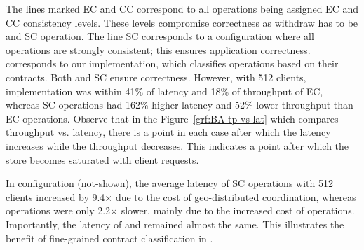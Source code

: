 The lines marked EC and CC correspond to all operations being assigned EC and
CC consistency levels. These levels compromise correctness as withdraw has to
be and SC operation. The line SC corresponds to a configuration where all
operations are strongly consistent; this ensures application correctness.
\quelea corresponds to our implementation, which classifies operations based on
their contracts. Both \quelea and SC ensure correctness. However, with 512
clients, \quelea implementation was within 41\% of latency and 18\% of
throughput of EC, whereas SC operations had 162\% higher latency and 52\% lower
throughput than EC operations. Observe that in the
Figure~\ref{grf:BA-tp-vs-lat} which compares throughput vs. latency, there is a
point in each case after which the latency increases while the throughput
decreases. This indicates a point after which the store becomes saturated with
client requests.

In  configuration (not-shown), the average latency of SC operations
with 512 clients increased by 9.4$\times$ due to the cost of geo-distributed
coordination, whereas \quelea operations were only 2.2$\times$ slower, mainly
due to the increased cost of  operations. Importantly, the latency
of  and  remained almost the same. This illustrates
the benefit of fine-grained contract classification in \quelea.


